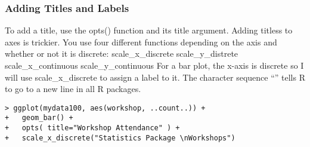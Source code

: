 \begin{frame}
\frametitle{Adding Titles and Labels}

To add a title, use the opts() function and its title argument. Adding titless to axes is trickier. 
You use four different functions depending on the axis and whether or not it is discrete: scale_x_discrete 
scale_y_distrete scale_x_continuous scale_y_continuous For a bar plot, the x-axis is discrete so I will use scale_x_discrete to assign a label to it. The character sequence “\n” tells R to go to a new line in all R packages.

\begin{verbatim}
> ggplot(mydata100, aes(workshop, ..count..)) +
+   geom_bar() +
+   opts( title="Workshop Attendance" ) +
+   scale_x_discrete("Statistics Package \nWorkshops")
\end{verbatim}
\end{frame}
